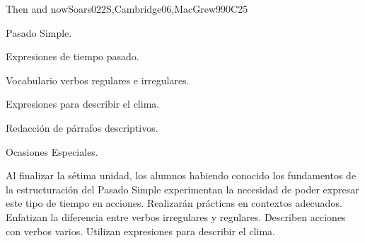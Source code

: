 \begin{syllabus}
\begin{unit}{Then and now}{}{Soars022S,Cambridge06,MacGrew99}{0}{C25}
   \begin{topics}
      \item Pasado Simple.
      \item Expresiones de tiempo pasado.
      \item Vocabulario verbos regulares e irregulares.
      \item Expresiones para describir el clima. 
      \item Redacción de párrafos descriptivos.
      \item Ocasiones Especiales.
   \end{topics}

   \begin{learningoutcomes}
      \item Al finalizar la sétima unidad, los alumnos habiendo conocido los fundamentos de la estructuración del Pasado Simple experimentan la necesidad de poder expresar este tipo de tiempo en acciones. Realizarán prácticas en contextos adecuados. Enfatizan la diferencia entre verbos irregulares y regulares. Describen acciones con verbos varios. Utilizan expresiones para describir el clima.
   \end{learningoutcomes}
\end{unit}



\begin{coursebibliography}
\end{coursebibliography}
\end{syllabus}
%
